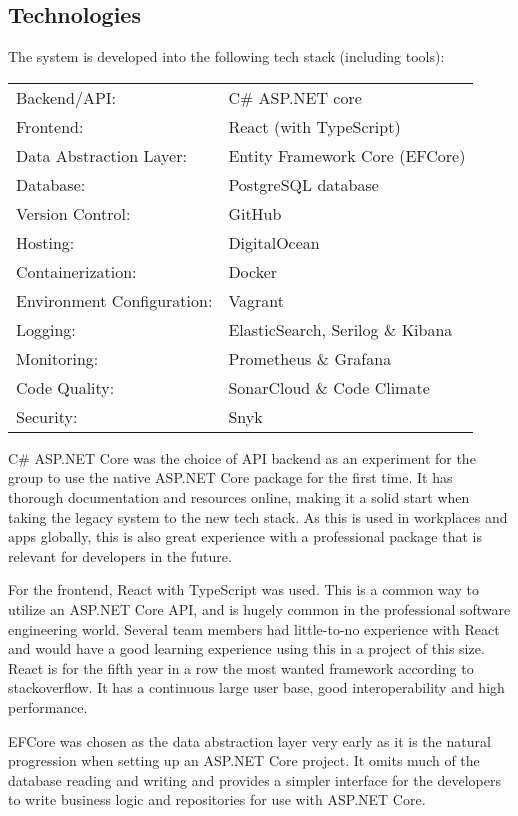 \subsection{Technologies}
The system is developed into the following tech stack (including tools): 
\begin{center}
\begin{tabular}{@{$\bullet$ }ll}
        Backend/API: & C\# ASP.NET core\\
        Frontend: & React (with TypeScript) \\
        Data Abstraction Layer: & Entity Framework Core (EFCore)\\
        Database: & PostgreSQL database \\
        Version Control: & GitHub \\
        Hosting: & DigitalOcean \\
        Containerization: & Docker \\
        Environment Configuration: & Vagrant \\
        Logging: & ElasticSearch, Serilog \& Kibana \\
        Monitoring: & Prometheus \& Grafana \\
        Code Quality: & SonarCloud \& Code Climate\\
        Security: & Snyk \\
\end{tabular}
\end{center}

C\# ASP.NET Core was the choice of API backend as an experiment for the group to use the native ASP.NET Core package for the first time. It has thorough documentation and resources online, making it a solid start when taking the legacy system to the new tech stack. As this is used in workplaces and apps globally, this is also great experience with a professional package that is relevant for developers in the future.

For the frontend, React with TypeScript was used. This is a common way to utilize an ASP.NET Core API, and is hugely common in the professional software engineering world. Several team members had little-to-no experience with React and would have a good learning experience using this in a project of this size. React is for the fifth year in a row the most wanted framework according to stackoverflow\cite{developerSurvey}. It has a continuous large user base, good interoperability and high performance.

EFCore was chosen as the data abstraction layer very early as it is the natural progression when setting up an ASP.NET Core project. It omits much of the database reading and writing and provides a simpler interface for the developers to write business logic and repositories for use with ASP.NET Core.

